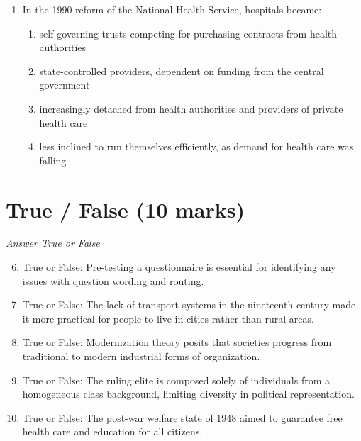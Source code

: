 \documentclass[12pt]{article}
\begin{document}
\begin{enumerate}[label=\arabic*.]
\begin{enumerate}[label=(\alph*)]
    \item effervescent ceremonies that create a feeling of belonging
    \item images of gods or totems that are widely recognized
    \item shared ideas and moral values, often symbolized by an object or figurehead
    \item ideological tools used to obscure class divisions
\end{enumerate}
\item In the 1990 reform of the National Health Service, hospitals became:
\begin{enumerate}[label=(\alph*)]
    \item self-governing trusts competing for purchasing contracts from health authorities
    \item state-controlled providers, dependent on funding from the central government
    \item increasingly detached from health authorities and providers of private health care
    \item less inclined to run themselves efficiently, as demand for health care was falling
\end{enumerate}
\end{enumerate}

\section*{True / False (10 marks)}
\textit{Answer True or False}
\begin{enumerate}[label=\arabic*.]
\setcounter{enumi}{5}
\item True or False: Pre-testing a questionnaire is essential for identifying any issues with question wording and routing.
\item True or False: The lack of transport systems in the nineteenth century made it more practical for people to live in cities rather than rural areas.
\item True or False: Modernization theory posits that societies progress from traditional to modern industrial forms of organization.
\item True or False: The ruling elite is composed solely of individuals from a homogeneous class background, limiting diversity in political representation.
\item True or False: The post-war welfare state of 1948 aimed to guarantee free health care and education for all citizens.
\end{enumerate}
\end{document}
